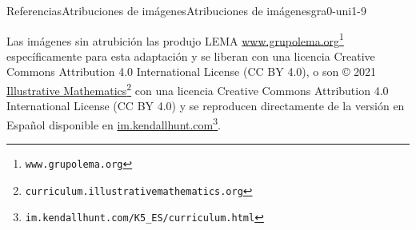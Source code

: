 %
%
\typeout{************************************************}
\typeout{************************************************}
%
\begin{references-section}{Referencias}{Atribuciones de imágenes}{}{Atribuciones de imágenes}{}{}{gra0-uni1-9}

\footnotesize 

Las imágenes sin atrubición las produjo LEMA \href{https://www.grupolema.org}{www.grupolema.org}\footnote{\nolinkurl{www.grupolema.org}\label{gra0-uni1-9-2-2}} específicamente para esta adaptación y se liberan con una licencia Creative Commons Attribution 4.0 International License (CC BY 4.0), o son © 2021 \href{https://curriculum.illustrativemathematics.org}{Illustrative Mathematics}\footnote{\nolinkurl{curriculum.illustrativemathematics.org}\label{gra0-uni1-9-2-4}} con una licencia Creative Commons Attribution 4.0 International License (CC BY 4.0) y se reproducen directamente de la versión en Español disponible en \href{https://im.kendallhunt.com/K5_ES/curriculum.html}{im.kendallhunt.com}\footnote{\nolinkurl{im.kendallhunt.com/K5_ES/curriculum.html}\label{gra0-uni1-9-2-6}}.%


\end{references-section}
%
%

